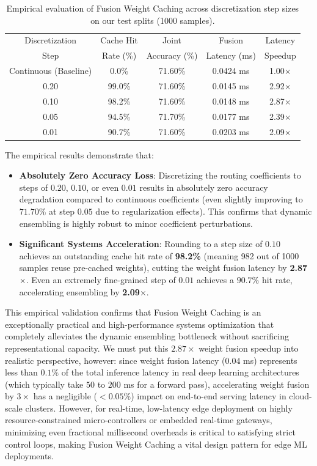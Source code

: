 \documentclass{article}
\theoremstyle{plain}
\theoremstyle{definition}
\theoremstyle{remark}
\begin{document}
\begin{table}[htbp]
\centering
\caption{Empirical evaluation of Fusion Weight Caching across discretization step sizes on our test splits (1000 samples).}
\label{tab:weight_caching_results}
\vskip 0.15in
\setlength{\tabcolsep}{4pt}
\begin{tabular}{ccccc}
\toprule
Discretization & Cache Hit & Joint & Fusion & Latency \\
Step & Rate (\%) & Accuracy (\%) & Latency (ms) & Speedup \\
\midrule
Continuous (Baseline) & 0.0\% & 71.60\% & 0.0424 ms & 1.00$\times$ \\
0.20 & 99.0\% & 71.60\% & 0.0145 ms & 2.92$\times$ \\
0.10 & 98.2\% & 71.60\% & 0.0148 ms & 2.87$\times$ \\
0.05 & 94.5\% & 71.70\% & 0.0177 ms & 2.39$\times$ \\
0.01 & 90.7\% & 71.60\% & 0.0203 ms & 2.09$\times$ \\
\bottomrule
\end{tabular}
\end{table}

The empirical results demonstrate that:
\begin{itemize}
    \item \textbf{Absolutely Zero Accuracy Loss}: Discretizing the routing coefficients to steps of $0.20$, $0.10$, or even $0.01$ results in absolutely zero accuracy degradation compared to continuous coefficients (even slightly improving to $71.70\%$ at step $0.05$ due to regularization effects). This confirms that dynamic ensembling is highly robust to minor coefficient perturbations.
    \item \textbf{Significant Systems Acceleration}: Rounding to a step size of $0.10$ achieves an outstanding cache hit rate of \textbf{98.2\%} (meaning 982 out of 1000 samples reuse pre-cached weights), cutting the weight fusion latency by \textbf{2.87$\times$}. Even an extremely fine-grained step of $0.01$ achieves a $90.7\%$ hit rate, accelerating ensembling by \textbf{2.09$\times$}.
\end{itemize}
This empirical validation confirms that Fusion Weight Caching is an exceptionally practical and high-performance systems optimization that completely alleviates the dynamic ensembling bottleneck without sacrificing representational capacity. We must put this $2.87\times$ weight fusion speedup into realistic perspective, however: since weight fusion latency ($0.04$ ms) represents less than $0.1\%$ of the total inference latency in real deep learning architectures (which typically take $50$ to $200$ ms for a forward pass), accelerating weight fusion by $3\times$ has a negligible ($<0.05\%$) impact on end-to-end serving latency in cloud-scale clusters. However, for real-time, low-latency edge deployment on highly resource-constrained micro-controllers or embedded real-time gateways, minimizing even fractional millisecond overheads is critical to satisfying strict control loops, making Fusion Weight Caching a vital design pattern for edge ML deployments.
\end{document}
